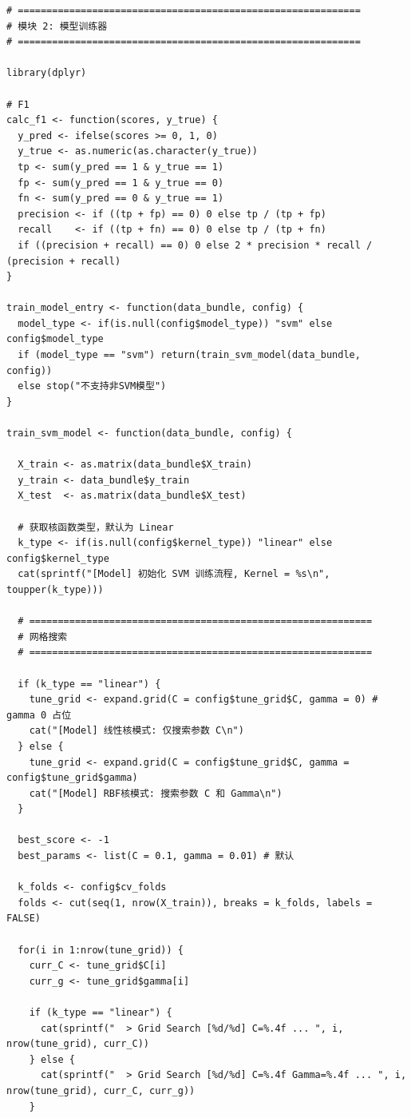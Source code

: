 \documentclass[11pt, a4paper]{article}
\begin{document}
\begin{verbatim}
# ============================================================
# 模块 2: 模型训练器
# ============================================================

library(dplyr)

# F1
calc_f1 <- function(scores, y_true) {
  y_pred <- ifelse(scores >= 0, 1, 0)
  y_true <- as.numeric(as.character(y_true))
  tp <- sum(y_pred == 1 & y_true == 1)
  fp <- sum(y_pred == 1 & y_true == 0)
  fn <- sum(y_pred == 0 & y_true == 1)
  precision <- if ((tp + fp) == 0) 0 else tp / (tp + fp)
  recall    <- if ((tp + fn) == 0) 0 else tp / (tp + fn)
  if ((precision + recall) == 0) 0 else 2 * precision * recall / (precision + recall)
}

train_model_entry <- function(data_bundle, config) {
  model_type <- if(is.null(config$model_type)) "svm" else config$model_type
  if (model_type == "svm") return(train_svm_model(data_bundle, config))
  else stop("不支持非SVM模型")
}

train_svm_model <- function(data_bundle, config) {
  
  X_train <- as.matrix(data_bundle$X_train)
  y_train <- data_bundle$y_train
  X_test  <- as.matrix(data_bundle$X_test)
  
  # 获取核函数类型，默认为 Linear
  k_type <- if(is.null(config$kernel_type)) "linear" else config$kernel_type
  cat(sprintf("[Model] 初始化 SVM 训练流程, Kernel = %s\n", toupper(k_type)))
  
  # ============================================================
  # 网格搜索
  # ============================================================
  
  if (k_type == "linear") {
    tune_grid <- expand.grid(C = config$tune_grid$C, gamma = 0) # gamma 0 占位
    cat("[Model] 线性核模式: 仅搜索参数 C\n")
  } else {
    tune_grid <- expand.grid(C = config$tune_grid$C, gamma = config$tune_grid$gamma)
    cat("[Model] RBF核模式: 搜索参数 C 和 Gamma\n")
  }
  
  best_score <- -1
  best_params <- list(C = 0.1, gamma = 0.01) # 默认
  
  k_folds <- config$cv_folds
  folds <- cut(seq(1, nrow(X_train)), breaks = k_folds, labels = FALSE)
  
  for(i in 1:nrow(tune_grid)) {
    curr_C <- tune_grid$C[i]
    curr_g <- tune_grid$gamma[i]
    
    if (k_type == "linear") {
      cat(sprintf("  > Grid Search [%d/%d] C=%.4f ... ", i, nrow(tune_grid), curr_C))
    } else {
      cat(sprintf("  > Grid Search [%d/%d] C=%.4f Gamma=%.4f ... ", i, nrow(tune_grid), curr_C, curr_g))
    }
    

\end{verbatim}
\end{document}
